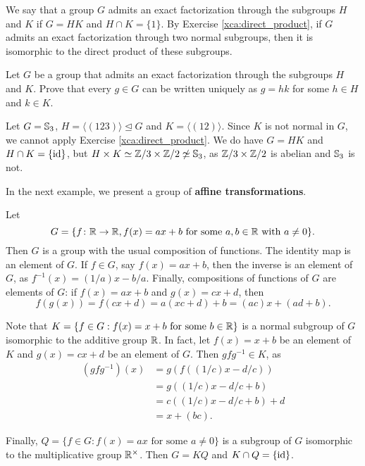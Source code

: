 We say that a group $G$ admits an exact factorization through 
the subgroups $H$ and $K$ if $G=HK$ and 
$H\cap K=\{1\}$. By Exercise \ref{xca:direct_product}, 
if $G$ admits an exact factorization through two normal subgroups, then 
it is isomorphic to the direct product of these subgroups. 

\begin{exercise}
    Let $G$ be a group that admits an exact factorization through
    the subgroups $H$ and $K$. Prove that every $g\in G$ can be written 
    uniquely as $g=hk$ for some $h\in H$ and $k\in K$. 
\end{exercise}

\begin{example}
Let $G=\mathbb{S}_3$, $H=\langle (123)\rangle\unlhd G$ and $K=\langle (12)\rangle$. Since
$K$ is not normal in $G$, we cannot apply Exercise \ref{xca:direct_product}. 
We do have $G=HK$ and $H\cap K=\{\operatorname{id}\}$, but $H\times K\simeq\mathbb{Z}/3\times\mathbb{Z}/2\not\simeq\mathbb{S}_3$, 
as $\mathbb{Z}/3\times\mathbb{Z}/2$ is abelian and $\mathbb{S}_3$ is not. 
\end{example}

In the next example, we present a group of \textbf{affine transformations}. 

\begin{example}
\label{exa:affine}
    Let 
    \[ 
    G=\{f\colon\mathbb{R}\to\mathbb{R}, f(x)=ax+b\text{ for some $a,b\in\mathbb{R}$ with $a\ne 0$}\}.
    \]
    Then $G$ is a group with the usual composition of functions. The identity map is an element of $G$. 
    If $f\in G$, say $f(x)=ax+b$, then the inverse is an element of $G$, as 
    $f^{-1}(x)=(1/a)x-b/a$. Finally, compositions of functions of $G$ are elements of $G$: 
    if $f(x)=ax+b$ and $g(x)=cx+d$, then 
    \[
    f(g(x))=f(cx+d)=a(xc+d)+b=(ac)x+(ad+b).
    \]
    
    Note that $K=\{f\in G:f(x)=x+b\text{ for some $b\in\mathbb{R}$}\}$ is a normal subgroup 
    of $G$ isomorphic to the additive group $\mathbb{R}$. In fact, let $f(x)=x+b$ be an element of $K$ 
    and $g(x)=cx+d$ be an element of $G$. Then $gfg^{-1}\in K$, as 
    \begin{align*}
    (gfg^{-1})(x)&=g(f((1/c)x-d/c))\\
    &=g((1/c)x-d/c+b)\\
    &=c( (1/c)x-d/c+b)+d\\
    &=x+(bc).
    \end{align*}
    
    Finally, 
    $Q=\{f\in G:f(x)=ax\text{ for some $a\ne0$}\}$ is a subgroup of $G$ isomorphic to the multiplicative group $\mathbb{R}^{\times}$. 
    Then $G=KQ$ and $K\cap Q=\{\operatorname{id}\}$.
\end{example}

